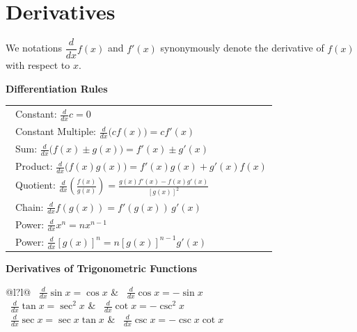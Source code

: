 \clearpage

\section{Derivatives}

We notations $\dfrac{d}{dx}f(x)$ and $f'(x)$  synonymously denote the derivative of $f(x)$ with respect to $x.$
\resetitems
\vspace{1em}

\noindent\textbf{Differentiation Rules}\\
\renewcommand{\arraystretch}{2.25}
\normalsize
\begin{tabular}{l}
	\nextitem\ 
	Constant:\quad
	$\displaystyle \frac{d}{dx}c = 0$\\
	\nextitem\ 
	Constant Multiple:\quad
	$\displaystyle \frac{d}{dx}\big(cf(x)\big) = c f'(x)$\\
	
	\nextitem\ 
	Sum:\quad
	$\displaystyle \frac{d}{dx}\!\big(f(x)\pm g(x)\big)
	= f'(x)\pm g'(x)$\\	
	\nextitem\ 
	Product:
	$\displaystyle \frac{d}{dx}\big(f(x)g(x)\big)
	= f'(x)g(x) + g'(x)f(x)$\\

	\nextitem\ 
	Quotient:\quad
	$\displaystyle \frac{d}{dx}\left(\frac{f(x)}{g(x)}\right)
	= \frac{g(x)f'(x)-f(x)g'(x)}{[g(x)]^{2}}$\\
	
	\nextitem\ 
	Chain:\quad
	$\displaystyle \frac{d}{dx}f(g(x)) = f'(g(x))\,g'(x)$\\
	
	\nextitem\ 
	Power:\quad
	$\displaystyle \frac{d}{dx}x^{n} = n x^{n-1}$\\
	\nextitem\ 
	Power:\quad
	$\displaystyle \frac{d}{dx}[g(x)]^{n}
	= n[g(x)]^{n-1}g'(x)$
\end{tabular}

\vspace{1em}


\noindent\textbf{Derivatives of Trigonometric Functions}\\
\begin{tabular}{@{}l?l@{}}
	\nextitem\ $\displaystyle \frac{d}{dx}\sin x = \cos x$	&
	\nextitem\ $\displaystyle \frac{d}{dx}\cos x = -\sin x$\\

	\nextitem\ $\displaystyle \frac{d}{dx}\tan x = \sec^{2}x$
&
	\nextitem\ $\displaystyle \frac{d}{dx}\cot x = -\csc^{2}x$\\
	
	\nextitem\ $\displaystyle \frac{d}{dx}\sec x = \sec x\tan x$
	&
	\nextitem\ $\displaystyle \frac{d}{dx}\csc x = -\csc x\cot x$\\
\end{tabular}

